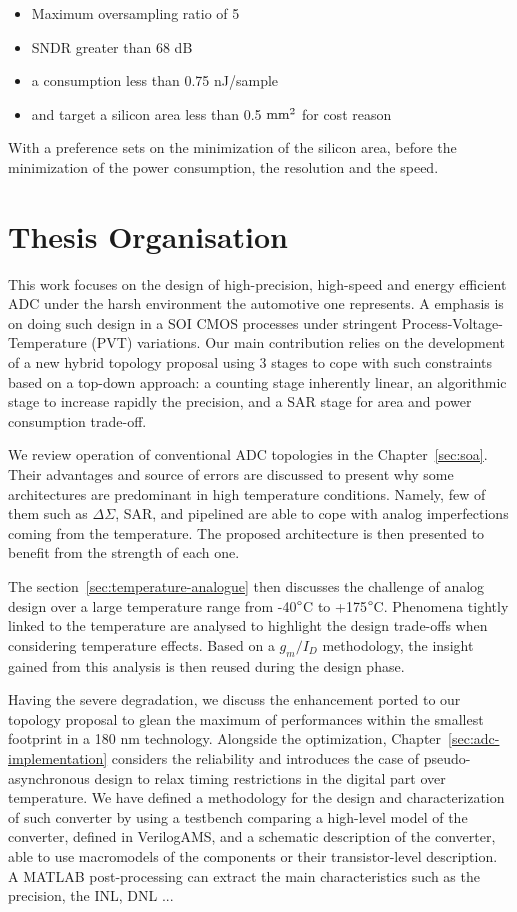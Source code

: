 \begin{itemize}
	\item Maximum oversampling ratio of 5
	\item SNDR greater than 68 dB
	\item a consumption less than 0.75 nJ/sample
	\item and target a silicon area less than 0.5 \(\rm mm^2 \) for cost reason
\end{itemize}
 
With a preference sets on the minimization of the silicon area, before the minimization of the power consumption, the resolution and the speed.

\section{Thesis Organisation}

This work focuses on the design of high-precision, high-speed and energy efficient ADC under the harsh environment the automotive one represents. A emphasis is on doing such design in a SOI CMOS processes under stringent Process-Voltage-Temperature (PVT) variations. Our main contribution relies on the development of a new hybrid topology proposal using 3 stages to cope with such constraints based on a top-down approach: a counting stage inherently linear, an algorithmic stage to increase rapidly the precision, and a SAR stage for area and power consumption trade-off.

We review operation of conventional ADC topologies in the Chapter~\ref{sec:soa}. Their advantages and source of errors are discussed to present why some architectures are predominant in high temperature conditions. Namely, few of them such as \(\Delta \Sigma\), SAR, and pipelined are able to cope with analog imperfections coming from the temperature. The proposed architecture is then presented to benefit from the strength of each one.

The section~\ref{sec:temperature-analogue} then discusses the challenge of analog design over a large temperature range from -40\(\degree\)C to +175\(\degree\)C. Phenomena tightly linked to the temperature are analysed to highlight the design trade-offs when considering temperature effects. Based on a \(g_m/I_D\) methodology, the insight gained from this analysis is then reused during the design phase.

Having the severe degradation, we discuss the enhancement ported to our topology proposal to glean the maximum of performances within the smallest footprint in a 180 nm technology. Alongside the optimization, Chapter~\ref{sec:adc-implementation} considers the reliability and introduces the case of pseudo-asynchronous design to relax timing restrictions in the digital part over temperature. We have defined a methodology for the design and characterization of such converter by using a testbench comparing a high-level model of the converter, defined in VerilogAMS, and a schematic description of the converter, able to use macromodels of the components or their transistor-level description. A MATLAB post-processing can extract the main characteristics such as the precision, the INL, DNL ...

